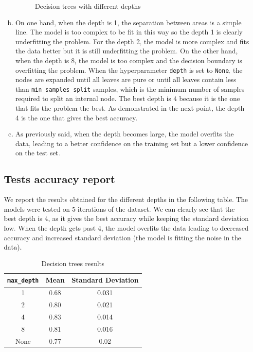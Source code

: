 \documentclass[12pt]{article}
\begin{document}
\begin{enumerate}[a)]
\begin{figure}[H]
		\caption{Decision trees with different depths}
		\label{fig:dt}
		\end{figure}
	\item On one hand, when the depth is 1, the separation between areas is a simple line. 
	The model is too complex to be fit in this way so the depth 1 is clearly underfitting the problem. 
	For the depth 2, the model is more complex and fits the data better but it is still underfitting the problem.
	On the other hand, when the depth is 8, the model is too complex and the decision boundary is overfitting the problem. 
	When the hyperparameter \verb|depth| is set to \verb|None|, the nodes are expanded until all leaves are pure or until all leaves contain less than \verb|min_samples_split| samples, which is the minimum number of samples required to split an internal node.
	The best depth is 4 because it is the one that fits the problem the best. As demonstrated in the next point, the depth 4 is the one that gives the best accuracy.
	\item As previously said, when the depth becomes large, the model overfits the data, leading to a better confidence on the training set but a lower confidence on the test set.
\end{enumerate}

\subsection{Tests accuracy report}
	We report the results obtained for the different depths in the following table. The models were tested on 5 iterations of the dataset. 
	We can clearly see that the best depth is 4, as it gives the best accuracy while keeping the standard deviation low.
	When the depth gets past 4, the model overfits the data leading to decreased accuracy and increased standard deviation (the model is fitting the noise in the data).

	\begin{table}[H]
		\centering
		\begin{tabular}{|c|c|c|}
		\hline
		\verb|max_depth| & Mean & Standard Deviation \\ \hline
		1                                & 0.68 & 0.031              \\ \hline
		2                                & 0.80 & 0.021              \\ \hline
		4                                & 0.83 & 0.014              \\ \hline
		8                                & 0.81 & 0.016              \\ \hline
		None                             & 0.77 & 0.02               \\ \hline
		\end{tabular}
		\caption{Decision trees results}
		\label{tab:results-dt}
		\end{table}
\end{document}
